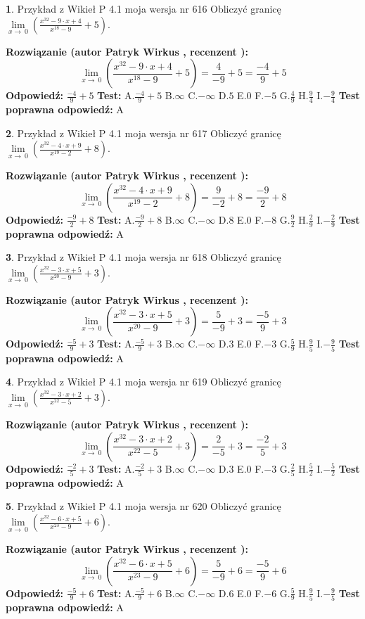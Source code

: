 \documentclass[12pt, a4paper]{article}
\theoremstyle{definition} %
\newtheorem{zad}{}
\newcommand{\zadStart}[1]{\begin{zad}#1\newline}
\newcommand{\zadStop}{\end{zad}}
\newcommand{\rozwStart}[2]{\noindent \textbf{Rozwiązanie (autor #1 , recenzent #2): }\newline}
\newcommand{\rozwStop}{\newline}
\newcommand{\odpStart}{\noindent \textbf{Odpowiedź:}\newline}
\newcommand{\odpStop}{\newline}
\newcommand{\testStart}{\noindent \textbf{Test:}\newline}
\newcommand{\testStop}{\newline}
\newcommand{\kluczStart}{\noindent \textbf{Test poprawna odpowiedź:}\newline}
\newcommand{\kluczStop}{\newline}
\begin{document}
\zadStart{Przykład z Wikieł P 4.1 moja wersja nr 616}
Obliczyć granicę $\lim\limits_{x\to\ 0}(\frac{x^{32}-9 \cdot x +4}{x^{18}-9}+5)$.
\zadStop
\rozwStart{Patryk Wirkus}{}
$$\lim\limits_{x\to\ 0}(\frac{x^{32}-9 \cdot x +4}{x^{18}-9}+5)=\frac{4}{-9}+5=\frac{-4}{9}+5$$
\rozwStop
\odpStart
$\frac{-4}{9}+5$
\odpStop
\testStart
A.$\frac{-4}{9}+5$
B.$\infty$
C.$-\infty$
D.$5$
E.$0$
F.$-5$
G.$\frac{4}{9}$
H.$\frac{9}{4}$
I.$-\frac{9}{4}$
\testStop
\kluczStart
A
\kluczStop



\zadStart{Przykład z Wikieł P 4.1 moja wersja nr 617}
Obliczyć granicę $\lim\limits_{x\to\ 0}(\frac{x^{32}-4 \cdot x +9}{x^{19}-2}+8)$.
\zadStop
\rozwStart{Patryk Wirkus}{}
$$\lim\limits_{x\to\ 0}(\frac{x^{32}-4 \cdot x +9}{x^{19}-2}+8)=\frac{9}{-2}+8=\frac{-9}{2}+8$$
\rozwStop
\odpStart
$\frac{-9}{2}+8$
\odpStop
\testStart
A.$\frac{-9}{2}+8$
B.$\infty$
C.$-\infty$
D.$8$
E.$0$
F.$-8$
G.$\frac{9}{2}$
H.$\frac{2}{9}$
I.$-\frac{2}{9}$
\testStop
\kluczStart
A
\kluczStop



\zadStart{Przykład z Wikieł P 4.1 moja wersja nr 618}
Obliczyć granicę $\lim\limits_{x\to\ 0}(\frac{x^{32}-3 \cdot x +5}{x^{20}-9}+3)$.
\zadStop
\rozwStart{Patryk Wirkus}{}
$$\lim\limits_{x\to\ 0}(\frac{x^{32}-3 \cdot x +5}{x^{20}-9}+3)=\frac{5}{-9}+3=\frac{-5}{9}+3$$
\rozwStop
\odpStart
$\frac{-5}{9}+3$
\odpStop
\testStart
A.$\frac{-5}{9}+3$
B.$\infty$
C.$-\infty$
D.$3$
E.$0$
F.$-3$
G.$\frac{5}{9}$
H.$\frac{9}{5}$
I.$-\frac{9}{5}$
\testStop
\kluczStart
A
\kluczStop



\zadStart{Przykład z Wikieł P 4.1 moja wersja nr 619}
Obliczyć granicę $\lim\limits_{x\to\ 0}(\frac{x^{32}-3 \cdot x +2}{x^{22}-5}+3)$.
\zadStop
\rozwStart{Patryk Wirkus}{}
$$\lim\limits_{x\to\ 0}(\frac{x^{32}-3 \cdot x +2}{x^{22}-5}+3)=\frac{2}{-5}+3=\frac{-2}{5}+3$$
\rozwStop
\odpStart
$\frac{-2}{5}+3$
\odpStop
\testStart
A.$\frac{-2}{5}+3$
B.$\infty$
C.$-\infty$
D.$3$
E.$0$
F.$-3$
G.$\frac{2}{5}$
H.$\frac{5}{2}$
I.$-\frac{5}{2}$
\testStop
\kluczStart
A
\kluczStop



\zadStart{Przykład z Wikieł P 4.1 moja wersja nr 620}
Obliczyć granicę $\lim\limits_{x\to\ 0}(\frac{x^{32}-6 \cdot x +5}{x^{23}-9}+6)$.
\zadStop
\rozwStart{Patryk Wirkus}{}
$$\lim\limits_{x\to\ 0}(\frac{x^{32}-6 \cdot x +5}{x^{23}-9}+6)=\frac{5}{-9}+6=\frac{-5}{9}+6$$
\rozwStop
\odpStart
$\frac{-5}{9}+6$
\odpStop
\testStart
A.$\frac{-5}{9}+6$
B.$\infty$
C.$-\infty$
D.$6$
E.$0$
F.$-6$
G.$\frac{5}{9}$
H.$\frac{9}{5}$
I.$-\frac{9}{5}$
\testStop
\kluczStart
A
\kluczStop
\end{document}
